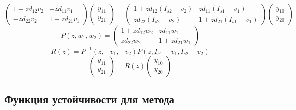 \documentclass[a4paper,article,14pt]{extarticle}
\begin{document}
\begin{equation}
\begin{pmatrix}
    1 - z d_{12} v_{2} & -z d_{11} v_{1} \\
    -z d_{22} v_{2} & 1 - z d_{21} v_{1}
\end{pmatrix}
\begin{pmatrix} y_{11}\\ y_{21} \end{pmatrix}
=
\begin{pmatrix}
    1 + z d_{12} (I_{s2} - v_{2}) & z d_{11} (I_{s1} - v_{1}) \\
    z d_{22} (I_{s2} - v_{2}) & 1 + z d_{21} (I_{s1} - v_{1})
\end{pmatrix}
\begin{pmatrix} y_{10}\\ y_{20} \end{pmatrix}
\end{equation}
\begin{equation}
P(z, w_{1}, w_{2}) = 
\begin{pmatrix}
    1 + z d_{12} w_{2} & z d_{11} w_{1} \\
    z d_{22} w_{2} & 1 + z d_{21} w_{1}
\end{pmatrix}
\end{equation}
\begin{equation}
    R(z) = P^{-1}(z , -v_{1}, -v_{2}) P(z, I_{s1} - v_{1}, I_{s2} - v_{2})
    \label{eq:stability_general}
\end{equation}
\begin{equation}
\begin{pmatrix} y_{11}\\ y_{21} \end{pmatrix}
    = R(z)
\begin{pmatrix} y_{10}\\ y_{20} \end{pmatrix}
\end{equation}

\subsection{Функция устойчивости для метода}
\end{document}
